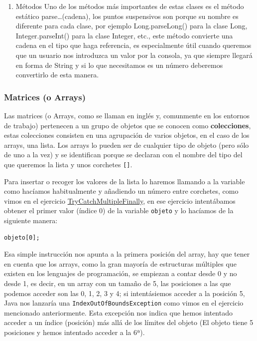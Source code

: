\documentclass[11pt]{article}
\begin{document}
\begin{enumerate}
\item Métodos
\label{sec:org44b46ef}
Uno de los métodos más importantes de estas clases es el método estático parse\ldots{}(cadena), los puntos suspensivos son porque su nombre es diferente para cada clase, por ejemplo Long.parseLong() para la clase Long, Integer.parseInt() para la clase Integer, etc., este método convierte una cadena en el tipo que haga referencia, es especialmente útil cuando queremos que un usuario nos introduzca un valor por la consola, ya que siempre llegará en forma de String y si lo que necesitamos es un número deberemos convertirlo de esta manera.
\end{enumerate}

\subsubsection{Matrices (o Arrays)}
\label{sec:org60b2b55}
Las matrices (o Arrays, como se llaman en inglés y, comunmente en los entornos de trabajo) pertenecen a un grupo de objetos que se conocen como \textbf{colecciones}, estas colecciones consisten en una agrupación de varios objetos, en el caso de los arrays, una lista. Los arrays lo pueden ser de cualquier tipo de objeto (pero sólo de uno a la vez) y se identifican porque se declaran con el nombre del tipo del que queremos la lista y unos corchetes \texttt{[]}.

Para insertar o recoger los valores de la lista lo haremos llamando a la variable como hacíamos habitualmente y añadiendo un número entre corchetes, como vimos en el ejercicio \hyperref[orga2fd6a2]{TryCatchMultipleFinally}, en ese ejercicio intentábamos obtener el primer valor (índice 0) de la variable \texttt{objeto} y lo hacíamos de la siguiente manera:

\begin{verbatim}
objeto[0];
\end{verbatim}

Esa simple instrucción nos apunta a la primera posición del array, hay que tener en cuenta que los arrays, como la gran mayoría de estructuras múltiples que existen en los lenguajes de programación, se empiezan a contar desde 0 y no desde 1, es decir, en un array con un tamaño de 5, las posiciones a las que podemos acceder son las 0, 1, 2, 3 y 4; si intentásiemos acceder a la posición 5, Java nos lanzaría una \texttt{IndexOutOfBoundsException} como vimos en el ejercicio mencionado anteriormente. Esta excepción nos indica que hemos intentado acceder a un índice (posición) más allá de los límites del objeto (El objeto tiene 5 posiciones y hemos intentado acceder a la 6ª).
\end{document}
